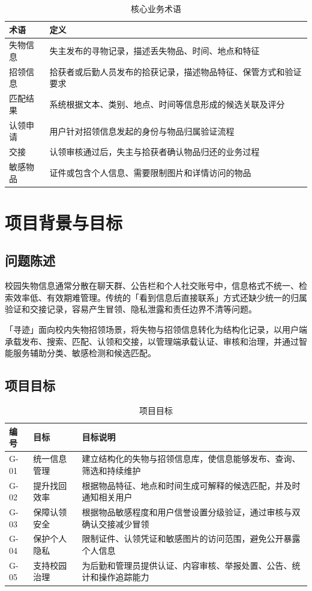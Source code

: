 \begin{table}[H]
  \centering
  \caption{核心业务术语}
  \begin{tabularx}{\textwidth}{L{2.8cm} Y}
    \toprule
    术语 & 定义 \\
    \midrule
    失物信息 & 失主发布的寻物记录，描述丢失物品、时间、地点和特征 \\
    招领信息 & 拾获者或后勤人员发布的拾获记录，描述物品特征、保管方式和验证要求 \\
    匹配结果 & 系统根据文本、类别、地点、时间等信息形成的候选关联及评分 \\
    认领申请 & 用户针对招领信息发起的身份与物品归属验证流程 \\
    交接 & 认领审核通过后，失主与拾获者确认物品归还的业务过程 \\
    敏感物品 & 证件或包含个人信息、需要限制图片和详情访问的物品 \\
    \bottomrule
  \end{tabularx}
\end{table}

\section{项目背景与目标}

\subsection{问题陈述}

校园失物信息通常分散在聊天群、公告栏和个人社交账号中，信息格式不统一、检索效率低、有效期难管理。传统的「看到信息后直接联系」方式还缺少统一的归属验证和交接记录，容易产生冒领、隐私泄露和责任边界不清等问题。

「寻迹」面向校内失物招领场景，将失物与招领信息转化为结构化记录，以用户端承载发布、搜索、匹配、认领和交接，以管理端承载认证、审核和治理，并通过智能服务辅助分类、敏感检测和候选匹配。

\subsection{项目目标}

\begin{table}[H]
  \centering
  \caption{项目目标}
  \begin{tabularx}{\textwidth}{L{1.6cm} L{3.2cm} Y}
    \toprule
    编号 & 目标 & 目标说明 \\
    \midrule
    G-01 & 统一信息管理 & 建立结构化的失物与招领信息库，使信息能够发布、查询、筛选和持续维护 \\
    G-02 & 提升找回效率 & 根据物品特征、地点和时间生成可解释的候选匹配，并及时通知相关用户 \\
    G-03 & 保障认领安全 & 根据物品敏感程度和用户信誉设置分级验证，通过审核与双确认交接减少冒领 \\
    G-04 & 保护个人隐私 & 限制证件、认领凭证和敏感图片的访问范围，避免公开暴露个人信息 \\
    G-05 & 支持校园治理 & 为后勤和管理员提供认证、内容审核、举报处置、公告、统计和操作追踪能力 \\
    \bottomrule
  \end{tabularx}
\end{table}


